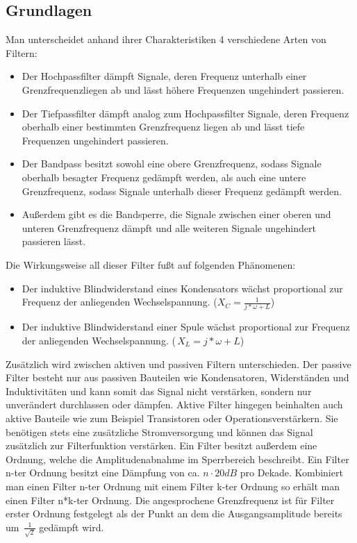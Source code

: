 \subsection{Grundlagen}
Man unterscheidet anhand ihrer Charakteristiken 4 verschiedene Arten von Filtern:
\begin{itemize}
\item Der Hochpassfilter dämpft Signale, deren Frequenz unterhalb einer Grenzfrequenzliegen ab und lässt höhere Frequenzen ungehindert passieren.\cite{skript}
\item Der Tiefpassfilter dämpft analog zum Hochpassfilter Signale, deren Frequenz oberhalb einer bestimmten Grenzfrequenz liegen ab und lässt tiefe Frequenzen ungehindert passieren.\cite{skript}
\item Der Bandpass besitzt sowohl eine obere Grenzfrequenz, sodass Signale oberhalb besagter Frequenz gedämpft werden, als auch eine untere Grenzfrequenz, sodass Signale unterhalb dieser Frequenz gedämpft werden.\cite{skript}
\item Außerdem gibt es die Bandsperre, die Signale zwischen einer oberen und unteren Grenzfrequenz dämpft und alle weiteren Signale ungehindert passieren lässt.\cite{skript}
\end{itemize}
Die Wirkungsweise all dieser Filter fußt auf folgenden Phänomenen:
\begin{itemize}
\item Der induktive Blindwiderstand eines Kondensators wächst proportional zur Frequenz der anliegenden Wechselspannung. ($X_{C}=\frac{1}{j*\omega+L}$) \cite{IBK}
\item Der induktive Blindwiderstand einer Spule wächst proportional zur Frequenz der anliegenden Wechselspannung. ($\,X_{L}=j*\omega+L$) \cite{IBS}
\end{itemize}
Zusätzlich wird zwischen aktiven und passiven Filtern unterschieden. Der passive Filter besteht nur aus passiven Bauteilen wie Kondensatoren, Widerständen und Induktivitäten und kann somit das Signal nicht verstärken, sondern nur unverändert durchlassen oder dämpfen. 
Aktive Filter hingegen beinhalten auch aktive Bauteile wie zum Beispiel Transistoren oder Operationsverstärkern. Sie benötigen stets eine zusätzliche Stromversorgung und können das Signal zusätzlich zur Filterfunktion verstärken.
\newline Ein Filter besitzt außerdem eine Ordnung, welche die Amplitudenabnahme im Sperrbereich beschreibt. Ein Filter n-ter Ordnung besitzt eine Dämpfung von ca. $n\cdot\si{20}{dB}$ pro Dekade. Kombiniert man einen Filter n-ter Ordnung mit einem Filter k-ter Ordnung so erhält man einen Filter n*k-ter Ordnung. \cite{DSV} \cite{filter}
\newline Die angesprochene Grenzfrequenz ist für Filter erster Ordnung festgelegt als der Punkt an dem die Ausgangsamplitude bereits um $\,\frac{1}{\sqrt{2}}$ gedämpft wird.\cite{herleitung}
